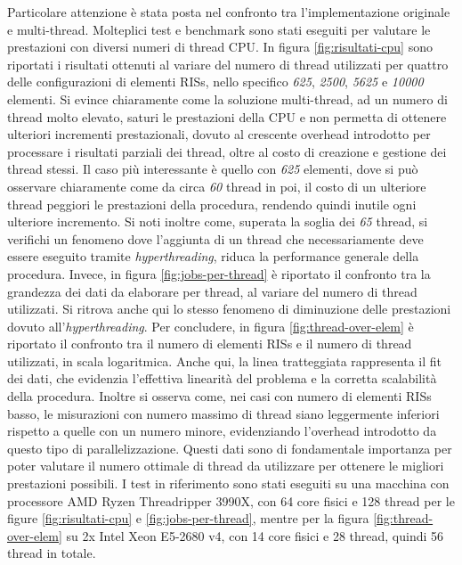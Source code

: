 Particolare attenzione è stata posta nel confronto tra l'implementazione
originale e multi-thread. Molteplici test e benchmark sono stati eseguiti per valutare
le prestazioni con diversi numeri di thread CPU. In figura
\ref{fig:risultati-cpu} sono riportati i risultati ottenuti al variare del
numero di thread utilizzati per quattro delle configurazioni di elementi RISs, nello
specifico \textit{625}, \textit{2500}, \textit{5625} e \textit{10000} elementi.
Si evince chiaramente come la soluzione multi-thread, ad un numero di thread molto
elevato, saturi le prestazioni della CPU e non permetta di ottenere ulteriori
incrementi prestazionali, dovuto al crescente overhead introdotto per processare
i risultati parziali dei thread, oltre al costo di creazione e gestione dei
thread stessi. Il caso più interessante è quello con \textit{625} elementi, dove
si può osservare chiaramente come da circa \textit{60} thread in poi, il costo di
un ulteriore thread peggiori le prestazioni della procedura, rendendo quindi
inutile ogni ulteriore incremento. Si noti inoltre come, superata la soglia dei
\textit{65} thread, si verifichi un fenomeno dove l'aggiunta di un thread che
necessariamente deve essere eseguito tramite \textit{hyperthreading}, riduca la
performance generale della procedura. Invece, in figura
\ref{fig:jobs-per-thread} è riportato il confronto tra la grandezza dei dati da
elaborare per thread, al variare del numero di thread utilizzati. Si ritrova
anche qui lo stesso fenomeno di diminuzione delle prestazioni dovuto all'\textit{hyperthreading}.
Per concludere, in figura \ref{fig:thread-over-elem} è riportato il confronto tra
il numero di elementi RISs e il numero di thread utilizzati, in scala
logaritmica. Anche qui, la linea tratteggiata rappresenta il fit dei dati, che evidenzia
l'effettiva linearità del problema e la corretta scalabilità della procedura.
Inoltre si osserva come, nei casi con numero di elementi RISs basso, le
misurazioni con numero massimo di thread siano leggermente inferiori rispetto a
quelle con un numero minore, evidenziando l'overhead introdotto da questo tipo di
parallelizzazione. Questi dati sono di fondamentale importanza per poter
valutare il numero ottimale di thread da utilizzare per ottenere le migliori
prestazioni possibili. I test in riferimento sono stati eseguiti su una macchina
con processore AMD Ryzen Threadripper 3990X, con 64 core fisici e 128 thread per
le figure \ref{fig:risultati-cpu} e \ref{fig:jobs-per-thread}, mentre per la figura
\ref{fig:thread-over-elem} su 2x Intel Xeon E5-2680 v4, con 14 core fisici e 28
thread, quindi 56 thread in totale.

